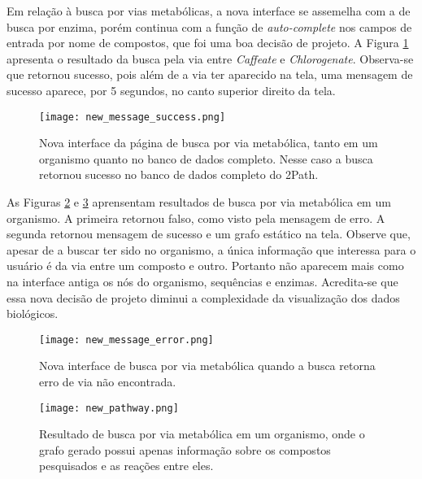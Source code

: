 \indent Em relação à busca por vias metabólicas, a nova interface se assemelha com a de busca por enzima, porém continua com a função de \textit{auto-complete} nos campos de entrada por nome de compostos, que foi uma boa decisão de projeto. A Figura \ref{fig:new_message_success} apresenta o resultado da busca pela via entre \textit{Caffeate} e \textit{Chlorogenate}. Observa-se que retornou sucesso, pois além de a via ter aparecido na tela, uma mensagem de sucesso aparece, por 5 segundos, no canto superior direito da tela.

\begin{figure}[!h]
    \centering
    \texttt{[image: new\_message\_success.png]}
    \caption{Nova interface da página de busca por via metabólica, tanto em um organismo quanto no banco de dados completo. Nesse caso a busca retornou sucesso no banco de dados completo do 2Path.}
    \label{fig:new_message_success}
\end{figure}

\indent As Figuras \ref{fig:new_message_error} e \ref{fig:new_pathway} aprensentam resultados de busca por via metabólica em um organismo. A primeira retornou falso, como visto pela mensagem de erro. A segunda retornou mensagem de sucesso e um grafo estático na tela. Observe que, apesar de a buscar ter sido no organismo, a única informação que interessa para o usuário é da via entre um composto e outro. Portanto não aparecem mais como na interface antiga os nós do organismo, sequências e enzimas. Acredita-se que essa nova decisão de projeto diminui a complexidade da visualização dos dados biológicos.

\begin{figure}[!h]
    \centering
    \texttt{[image: new\_message\_error.png]}
    \caption{Nova interface de busca por via metabólica quando a busca retorna erro de via não encontrada.}
    \label{fig:new_message_error}
\end{figure}

\newpage
\begin{figure}[!t]
    \centering
    \texttt{[image: new\_pathway.png]}
    \caption{Resultado de busca por via metabólica em um organismo, onde o grafo gerado possui apenas informação sobre os compostos pesquisados e as reações entre eles.}
    \label{fig:new_pathway}
\end{figure}




